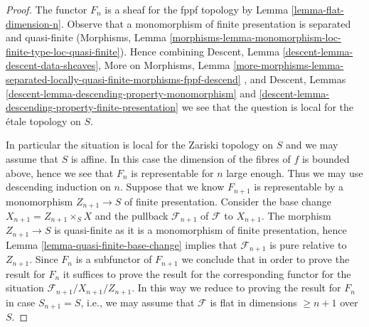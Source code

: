 \begin{proof}
The functor $F_n$ is a sheaf for the fppf topology by
Lemma \ref{lemma-flat-dimension-n}.
Observe that a monomorphism of finite presentation is
separated and quasi-finite (Morphisms, Lemma
\ref{morphisms-lemma-monomorphism-loc-finite-type-loc-quasi-finite}).
Hence combining
Descent, Lemma \ref{descent-lemma-descent-data-sheaves},
More on Morphisms, Lemma
\ref{more-morphisms-lemma-separated-locally-quasi-finite-morphisms-fppf-descend}
, and
Descent, Lemmas \ref{descent-lemma-descending-property-monomorphism} and
\ref{descent-lemma-descending-property-finite-presentation}
we see that the question is local for the \'etale topology on $S$.

\medskip\noindent
In particular the situation is local for the Zariski topology on $S$
and we may assume that $S$ is affine. In this case the dimension of the
fibres of $f$ is bounded above, hence we see that $F_n$ is representable
for $n$ large enough. Thus we may use descending induction on $n$.
Suppose that we know $F_{n + 1}$ is representable by a monomorphism
$Z_{n + 1} \to S$ of finite presentation. Consider the base change
$X_{n + 1} = Z_{n + 1} \times_S X$ and the pullback $\mathcal{F}_{n + 1}$
of $\mathcal{F}$ to $X_{n + 1}$. The morphism $Z_{n + 1} \to S$ is
quasi-finite as it is a monomorphism of finite presentation, hence
Lemma \ref{lemma-quasi-finite-base-change}
implies that $\mathcal{F}_{n + 1}$ is pure relative to $Z_{n + 1}$.
Since $F_n$ is a subfunctor of $F_{n + 1}$ we conclude that in order
to prove the result for $F_n$ it suffices to prove the result for the
corresponding functor for the situation
$\mathcal{F}_{n + 1}/X_{n + 1}/Z_{n + 1}$.
In this way we reduce to proving the result for $F_n$ in case
$S_{n + 1} = S$, i.e., we may assume that $\mathcal{F}$ is flat
in dimensions $\geq n + 1$ over $S$.


\end{proof}
